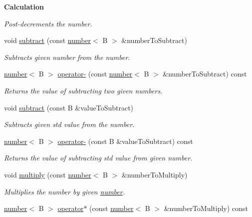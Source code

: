 \begin{Indent}{\bf Calculation}
\begin{DoxyCompactItemize}
\begin{DoxyCompactList}\small\item\em Post-\/decrements the number. \end{DoxyCompactList}\item 
void \hyperlink{classcjr_1_1number_aa29378479836924b1110f40570198ada}{subtract} (const \hyperlink{classcjr_1_1number}{number}$<$ B $>$ \&number\-To\-Subtract)
\begin{DoxyCompactList}\small\item\em Subtracts given number from the number. \end{DoxyCompactList}\item 
\hypertarget{classcjr_1_1number_a9b54e89597d8db867a7d30bab2c8d10a}{\hyperlink{classcjr_1_1number}{number}$<$ B $>$ \hyperlink{classcjr_1_1number_a9b54e89597d8db867a7d30bab2c8d10a}{operator-\/} (const \hyperlink{classcjr_1_1number}{number}$<$ B $>$ \&number\-To\-Subtract) const }\label{classcjr_1_1number_a9b54e89597d8db867a7d30bab2c8d10a}

\begin{DoxyCompactList}\small\item\em Returns the value of subtracting two given numbers. \end{DoxyCompactList}\item 
void \hyperlink{classcjr_1_1number_af95e527ca950399a3af5dbf12d01afc5}{subtract} (const B \&value\-To\-Subtract)
\begin{DoxyCompactList}\small\item\em Subtracts given std value from the number. \end{DoxyCompactList}\item 
\hypertarget{classcjr_1_1number_ad48de2316e1e5c962c84eb4f4ad5cfc8}{\hyperlink{classcjr_1_1number}{number}$<$ B $>$ \hyperlink{classcjr_1_1number_ad48de2316e1e5c962c84eb4f4ad5cfc8}{operator-\/} (const B \&value\-To\-Subtract) const }\label{classcjr_1_1number_ad48de2316e1e5c962c84eb4f4ad5cfc8}

\begin{DoxyCompactList}\small\item\em Returns the value of subtracting std value from given number. \end{DoxyCompactList}\item 
void \hyperlink{classcjr_1_1number_a9bfb2e6eb2297527aa34f21c84c92c1c}{multiply} (const \hyperlink{classcjr_1_1number}{number}$<$ B $>$ \&number\-To\-Multiply)
\begin{DoxyCompactList}\small\item\em Multiplies the number by given \hyperlink{classcjr_1_1number}{number}. \end{DoxyCompactList}\item 
\hypertarget{classcjr_1_1number_add3f6150a03f6f1d78df5bf73eb36759}{\hyperlink{classcjr_1_1number}{number}$<$ B $>$ \hyperlink{classcjr_1_1number_add3f6150a03f6f1d78df5bf73eb36759}{operator$\ast$} (const \hyperlink{classcjr_1_1number}{number}$<$ B $>$ \&number\-To\-Multiply) const }\label{classcjr_1_1number_add3f6150a03f6f1d78df5bf73eb36759}


\end{DoxyCompactItemize}
\end{Indent}
